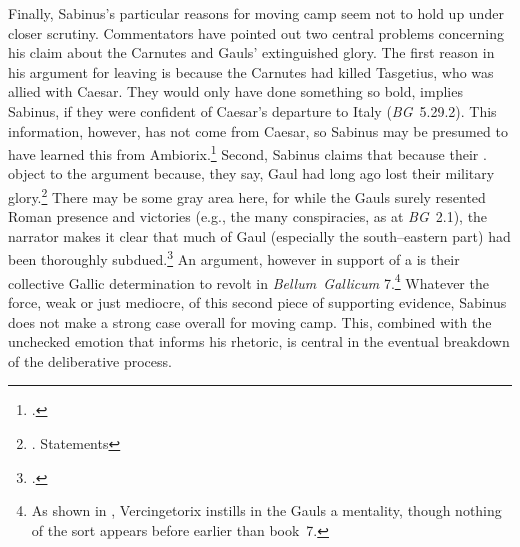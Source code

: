\documentclass[12pt,letterpaper,oneside,final]{memoir}
\begin{document}
Finally, Sabinus's particular reasons for moving camp seem not to hold up under closer scrutiny. Commentators have pointed out two central problems concerning his claim about the Carnutes and Gauls' extinguished glory. The first reason in his argument for leaving is because the Carnutes had killed Tasgetius, who was allied with Caesar. They would only have done something so bold, implies Sabinus, if they were confident of Caesar's departure to Italy (\emph{BG}~5.29.2). This information, however, has not come from Caesar, so Sabinus may be presumed to have learned this from Ambiorix.\footnote{.} Second, Sabinus claims that  because their . \textcite{kranerdittenbergermeusel1967} object to the argument because, they say, Gaul had long ago lost their military glory.\footnote{. Statements } There may be some gray area here, for while the Gauls surely resented Roman presence and victories (e.g., the many conspiracies, as at \emph{BG}~2.1), the narrator makes it clear that much of Gaul (especially the south--eastern part) had been thoroughly subdued.\footnote{.} An argument, however in support of a  is their collective Gallic determination to revolt in \emph{Bellum~Gallicum} 7.\footnote{As shown in \textcite[177--181]{jervis2001}, Vercingetorix instills in the Gauls a  mentality, though nothing of the sort appears before earlier than book~7.} Whatever the force, weak or just mediocre, of this second piece of supporting evidence, Sabinus does not make a strong case overall for moving camp. This, combined with the unchecked emotion that informs his rhetoric, is central in the eventual breakdown of the deliberative process.
\end{document}
